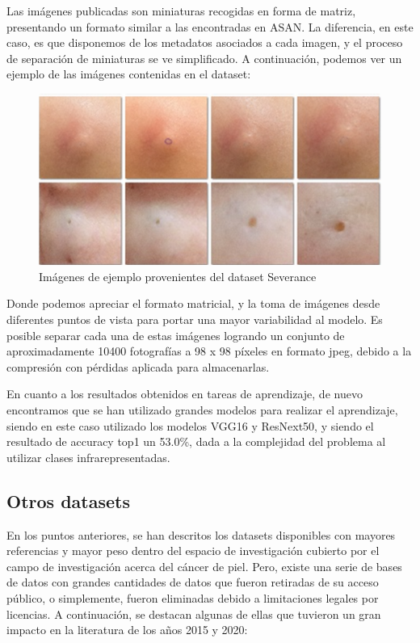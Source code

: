 Las imágenes publicadas son miniaturas recogidas en forma de matriz, presentando un formato similar a las encontradas en ASAN. La diferencia, en este caso, es que disponemos de los metadatos asociados a cada imagen, y el proceso de separación de miniaturas se ve simplificado. A continuación, podemos ver un ejemplo de las imágenes contenidas en el dataset:

\begin{figure}[H]
	\centering
	\includegraphics[scale = 0.5]{imagenes/Severance.png}
	\caption{Imágenes de ejemplo provenientes del dataset Severance   }
\end{figure}

Donde podemos apreciar el formato matricial, y la toma de imágenes desde diferentes puntos de vista para portar una mayor variabilidad al modelo. Es posible separar cada una de estas imágenes logrando un conjunto de aproximadamente 10400 fotografías a 98 x 98 píxeles en formato jpeg, debido a la compresión con pérdidas aplicada para almacenarlas.

En cuanto a los resultados obtenidos en tareas de aprendizaje, de nuevo encontramos que se han utilizado grandes modelos para realizar el aprendizaje, siendo en este caso utilizado los modelos VGG16 y ResNext50, y siendo el resultado de accuracy top1 un 53.0\%,  dada a la complejidad del problema al utilizar clases infrarepresentadas.

\subsection{Otros datasets}

En los puntos anteriores, se han descritos los datasets disponibles con mayores referencias y mayor peso dentro del espacio de investigación cubierto por el campo de investigación acerca del cáncer de piel. Pero, existe una serie de bases de datos con grandes cantidades de datos que fueron retiradas de su acceso público, o simplemente, fueron eliminadas debido a limitaciones legales por licencias. A continuación, se destacan algunas de ellas que tuvieron un gran impacto en la literatura de los años 2015 y 2020:

